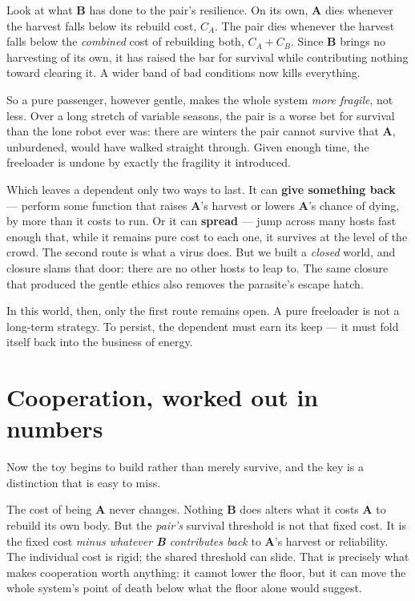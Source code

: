 \documentclass{article}
\begin{document}
Look at what \textbf{B} has done to the pair's resilience. On its own, \textbf{A} dies whenever the harvest falls below its rebuild cost, \( C_A \). The pair dies whenever the harvest falls below the \emph{combined} cost of rebuilding both, \( C_A + C_B \). Since \textbf{B} brings no harvesting of its own, it has raised the bar for survival while contributing nothing toward clearing it. A wider band of bad conditions now kills everything.

So a pure passenger, however gentle, makes the whole system \emph{more fragile}, not less. Over a long stretch of variable seasons, the pair is a worse bet for survival than the lone robot ever was: there are winters the pair cannot survive that \textbf{A}, unburdened, would have walked straight through. Given enough time, the freeloader is undone by exactly the fragility it introduced.

Which leaves a dependent only two ways to last. It can \textbf{give something back} --- perform some function that raises \textbf{A}'s harvest or lowers \textbf{A}'s chance of dying, by more than it costs to run. Or it can \textbf{spread} --- jump across many hosts fast enough that, while it remains pure cost to each one, it survives at the level of the crowd. The second route is what a virus does. But we built a \emph{closed} world, and closure slams that door: there are no other hosts to leap to. The same closure that produced the gentle ethics also removes the parasite's escape hatch.

In this world, then, only the first route remains open. A pure freeloader is not a long-term strategy. To persist, the dependent must earn its keep --- it must fold itself back into the business of energy.

\section*{Cooperation, worked out in numbers}

Now the toy begins to build rather than merely survive, and the key is a distinction that is easy to miss.

The cost of being \textbf{A} never changes. Nothing \textbf{B} does alters what it costs \textbf{A} to rebuild its own body. But the \emph{pair's} survival threshold is not that fixed cost. It is the fixed cost \emph{minus whatever \textbf{B} contributes back} to \textbf{A}'s harvest or reliability. The individual cost is rigid; the shared threshold can slide. That is precisely what makes cooperation worth anything: it cannot lower the floor, but it can move the whole system's point of death below what the floor alone would suggest.
\end{document}
